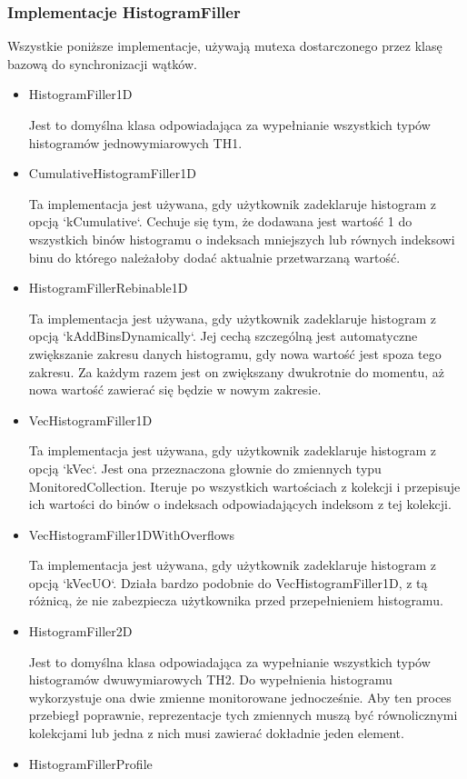 \subsubsection{Implementacje HistogramFiller}
Wszystkie poniższe implementacje, używają mutexa dostarczonego przez klasę bazową do synchronizacji wątków. 
\begin{itemize}
\item HistogramFiller1D

	Jest to domyślna klasa odpowiadająca za wypełnianie wszystkich typów histogramów jednowymiarowych TH1. 
\item CumulativeHistogramFiller1D

	Ta implementacja jest używana, gdy użytkownik zadeklaruje histogram z opcją `kCumulative`.
	Cechuje się tym, że dodawana jest wartość 1 do wszystkich binów histogramu o indeksach mniejszych lub równych indeksowi binu do którego należałoby dodać aktualnie przetwarzaną wartość.
\item HistogramFillerRebinable1D

	Ta implementacja jest używana, gdy użytkownik zadeklaruje histogram z opcją `kAddBinsDynamically`.
	Jej cechą szczególną jest automatyczne zwiększanie zakresu danych histogramu, gdy nowa wartość jest spoza tego zakresu. Za każdym razem jest on zwiększany dwukrotnie do momentu, aż nowa wartość zawierać się będzie w nowym zakresie.
\item VecHistogramFiller1D

	Ta implementacja jest używana, gdy użytkownik zadeklaruje histogram z opcją `kVec`.
	Jest ona przeznaczona głownie do zmiennych typu MonitoredCollection.
	Iteruje po wszystkich wartościach z kolekcji i przepisuje ich wartości do binów o indeksach odpowiadających indeksom z tej kolekcji.
\item VecHistogramFiller1DWithOverflows

	Ta implementacja jest używana, gdy użytkownik zadeklaruje histogram z opcją `kVecUO`.
	Działa bardzo podobnie do VecHistogramFiller1D, z tą różnicą, że nie zabezpiecza użytkownika przed przepełnieniem histogramu.
\item HistogramFiller2D

	Jest to domyślna klasa odpowiadająca za wypełnianie wszystkich typów histogramów dwuwymiarowych TH2.
	Do wypełnienia histogramu wykorzystuje ona dwie zmienne monitorowane jednocześnie.
	Aby ten proces przebiegł poprawnie, reprezentacje tych zmiennych muszą być równolicznymi kolekcjami lub jedna z nich musi zawierać dokładnie jeden element. 
\item HistogramFillerProfile


\end{itemize}
